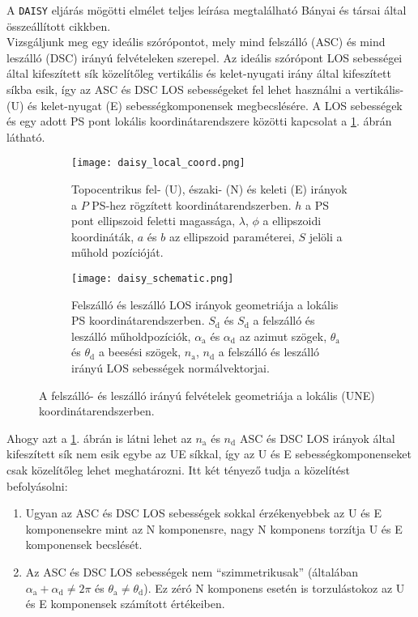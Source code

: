 \documentclass[12pt]{report}
\numberwithin{equation}{section}
\numberwithin{table}{section}
\numberwithin{figure}{section}
\begin{document}
A \texttt{DAISY} eljárás mögötti elmélet teljes leírása megtalálható Bányai és társai által összeállított \cite{Banyai2016} cikkben.\\[15pt]
Vizsgáljunk meg egy ideális szórópontot, mely mind felszálló (ASC) és mind leszálló (DSC) irányú felvételeken szerepel. Az ideális szórópont LOS sebességei által kifeszített sík közelítőleg vertikális és kelet-nyugati irány által kifeszített síkba esik, így az ASC és DSC LOS sebességeket fel lehet használni a vertikális-(U) és  kelet-nyugat (E) sebességkomponensek megbecslésére. A LOS sebességek és egy adott PS pont lokális koordinátarendszere közötti kapcsolat a \ref{daisy_schematic}. ábrán látható.

\begin{center}
    \begin{figure}[H]
        \begin{subfigure}[t]{.49\linewidth}
            \centering
            \texttt{[image: daisy\_local\_coord.png]}
            \caption{Topocentrikus fel- (U), északi- (N) és keleti (E) irányok a $P$ PS-hez rögzített koordinátarendszerben. $h$ a PS pont ellipszoid feletti magassága, $\lambda$, $\phi$ a ellipszoidi koordináták, $a$ és $b$ az ellipszoid paraméterei, $S$ jelöli a műhold pozícióját.}
        \end{subfigure}
        \hspace{25pt}
        \begin{subfigure}[t]{.49\linewidth}
            \centering
            \texttt{[image: daisy\_schematic.png]}
            \caption{Felszálló és leszálló LOS irányok geometriája a lokális PS koordinátarendszerben. $S_{\text{d}}$ és $S_{\text{d}}$ a felszálló és leszálló műholdpozíciók, $\alpha_{\text{a}}$ és $\alpha_{\text{d}}$ az azimut szögek, $\theta_{\text{a}}$ és $\theta_{\text{d}}$ a beesési szögek, $n_{\text{a}}$, $n_{\text{d}}$ a felszálló és leszálló irányú LOS sebességek normálvektorjai.}
        \end{subfigure}
    \caption{A felszálló- és leszálló irányú felvételek geometriája a lokális (UNE) koordinátarendszerben. \cite{Banyai2017}}\label{daisy_schematic}
    \end{figure}
\end{center}

Ahogy azt a \ref{daisy_schematic}. ábrán is látni lehet az $n_{\text{a}}$ és $n_{\text{d}}$ ASC és DSC LOS irányok által kifeszített sík nem esik egybe az UE síkkal, így az U és E sebességkomponenseket csak közelítőleg lehet meghatározni. Itt két tényező tudja a közelítést befolyásolni:
\begin{enumerate}
    \item Ugyan az ASC és DSC LOS sebességek sokkal érzékenyebbek az U és E komponensekre mint az N komponensre, nagy N komponens torzítja U és E komponensek becslését.
    \item Az ASC és DSC LOS sebességek nem ``szimmetrikusak'' (általában $\alpha_{\text{a}} + \alpha_{\text{d}} \ne 2 \pi$ és $\theta_{\text{a}} \ne \theta_{\text{d}}$). Ez zéró N komponens esetén is torzulástokoz az U és E komponensek számított értékeiben.
\end{enumerate}
\end{document}
